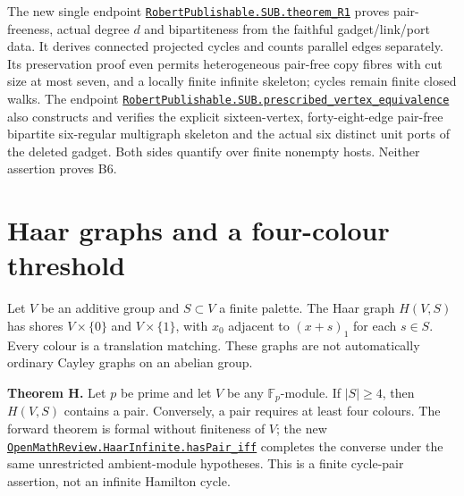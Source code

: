 \documentclass[smallextended]{svjour3}
\newcounter{none} %
\begin{document}
The new single endpoint
\href{https://github.com/alejandrozu/openmath-2026-judging/blob/70c5ec3107658182f22c207d4c50f53f9cb3e602/robert-review-2026-10-07/lean/R1.lean\#L13}{{\ttfamily\nolinkurl{RobertPublishable.SUB.theorem_R1}}}
proves pair-freeness, actual degree \(d\) and bipartiteness from the
faithful gadget/link/port data. It derives connected projected cycles
and counts parallel edges separately. Its preservation proof even
permits heterogeneous pair-free copy fibres with cut size at most seven,
and a locally finite infinite skeleton; cycles remain finite closed
walks. The endpoint
\href{https://github.com/alejandrozu/openmath-2026-judging/blob/70c5ec3107658182f22c207d4c50f53f9cb3e602/robert-review-2026-10-07/lean/PrescribedVertex.lean\#L89}{{\ttfamily\nolinkurl{RobertPublishable.SUB.prescribed_vertex_equivalence}}}
also constructs and verifies the explicit sixteen-vertex,
forty-eight-edge pair-free bipartite six-regular multigraph skeleton and
the actual six distinct unit ports of the deleted gadget. Both sides
quantify over finite nonempty hosts. Neither assertion proves B6.

\section{Haar graphs and a four-colour
threshold}\label{haar-graphs-and-a-four-colour-threshold}

Let \(V\) be an additive group and \(S\subset V\) a finite palette. The
Haar graph \(H(V,S)\) has shores \(V\times\{0\}\) and \(V\times\{1\}\),
with \(x_0\) adjacent to \((x+s)_1\) for each \(s\in S\). Every colour
is a translation matching. These graphs are not automatically ordinary
Cayley graphs on an abelian group.

\textbf{Theorem H.} Let \(p\) be prime and let \(V\) be any
\(\mathbb F_p\)-module. If \(|S|\geq4\), then \(H(V,S)\) contains a
pair. Conversely, a pair requires at least four colours. The forward
theorem is formal without finiteness of \(V\); the new
\href{https://github.com/alejandrozu/openmath-2026-judging/blob/70c5ec3107658182f22c207d4c50f53f9cb3e602/robert-review-2026-10-07/lean/HaarInfinite.lean\#L110}{{\ttfamily\nolinkurl{OpenMathReview.HaarInfinite.hasPair_iff}}}
completes the converse under the same unrestricted ambient-module
hypotheses. This is a finite cycle-pair assertion, not an infinite
Hamilton cycle.
\end{document}
